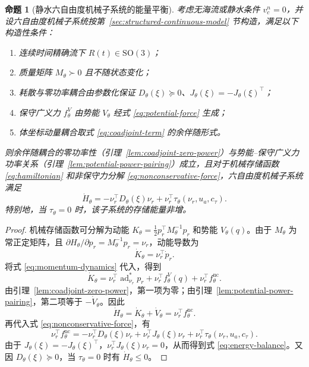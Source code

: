 \documentclass[UTF8,zihao=-4]{ctexrep}
\newtheorem{proposition}{命题}[chapter]
\newcommand{\SO}{\mathrm{SO}}
\newcommand{\ad}{\operatorname{ad}}
\begin{document}
\begin{proposition}[静水六自由度机械子系统的能量平衡]
  \label{prop:hydrostatic-energy-balance}
  考虑无海流或静水条件 \(v_c^n=0\)，并设六自由度机械子系统按第~\ref{sec:structured-continuous-model} 节构造，满足以下构造性条件：
  \begin{enumerate}
    \item 连续时间精确流下 \(R(t)\in\SO(3)\)；
    \item 质量矩阵 \(M_\theta\succ0\) 且不随状态变化；
    \item 耗散与零功率耦合由参数化保证 \(D_\theta(\xi)\succeq0\)、\(J_\theta(\xi)=-J_\theta(\xi)^\top\)；
    \item 保守广义力 \(f_\theta^V\) 由势能 \(V_\theta\) 经式 \eqref{eq:potential-force} 生成；
    \item 体坐标动量耦合取式 \eqref{eq:coadjoint-term} 的余伴随形式。
  \end{enumerate}
  则余伴随耦合的零功率性（引理~\ref{lem:coadjoint-zero-power}）与势能--保守广义力功率关系（引理~\ref{lem:potential-power-pairing}）成立，且对于机械存储函数 \eqref{eq:hamiltonian} 和非保守力分解 \eqref{eq:nonconservative-force}，六自由度机械子系统满足
  \begin{equation}
    \dot H_\theta
    =
    -\nu_r^\top D_\theta(\xi)\nu_r
    +\nu_r^\top\tau_\theta(\nu_r,u_a,c_\tau).
    \label{eq:energy-balance}
  \end{equation}
  特别地，当 \(\tau_\theta=0\) 时，该子系统的存储能量非增。
\end{proposition}

\begin{proof}
机械存储函数可分解为动能 \(K_\theta=\frac12p_r^\top M_\theta^{-1}p_r\) 和势能 \(V_\theta(q)\)。由于 \(M_\theta\) 为常正定矩阵，且 \(\partial H_\theta/\partial p_r=M_\theta^{-1}p_r=\nu_r\)，动能导数为
\begin{equation}
  \dot K_\theta
  =
  \nu_r^\top \dot p_r .
\end{equation}
将式 \eqref{eq:momentum-dynamics} 代入，得到
\begin{equation}
  \dot K_\theta
  =
  \nu_r^\top\ad_{\nu_r}^{\ast}p_r
  +\nu_r^\top f_\theta^V(q)
  +\nu_r^\top f_\theta^{\mathrm{nc}} .
\end{equation}
由引理~\ref{lem:coadjoint-zero-power}，第一项为零；由引理~\ref{lem:potential-power-pairing}，第二项等于 \(-\dot V_\theta\)。因此
\begin{equation}
  \dot H_\theta
  =
  \dot K_\theta+\dot V_\theta
  =
  \nu_r^\top f_\theta^{\mathrm{nc}} .
\end{equation}
再代入式 \eqref{eq:nonconservative-force}，有
\begin{equation}
  \nu_r^\top f_\theta^{\mathrm{nc}}
  =
  -\nu_r^\top D_\theta(\xi)\nu_r
  +\nu_r^\top J_\theta(\xi)\nu_r
  +\nu_r^\top\tau_\theta(\nu_r,u_a,c_\tau).
\end{equation}
由于 \(J_\theta(\xi)=-J_\theta(\xi)^\top\)，\(\nu_r^\top J_\theta(\xi)\nu_r=0\)，从而得到式 \eqref{eq:energy-balance}。又因 \(D_\theta(\xi)\succeq0\)，当 \(\tau_\theta=0\) 时有 \(\dot H_\theta\le0\)。
\end{proof}
\end{document}
